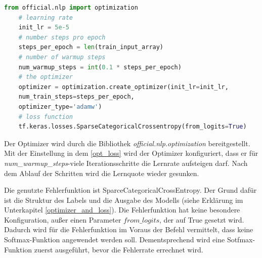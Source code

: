 \begin{lstlisting}[language=Python, caption={BERT Optimizer}, label=opt_loss]
	from official.nlp import optimization
	# learning rate
	init_lr = 5e-5
	# number steps pro epoch
	steps_per_epoch = len(train_input_array)
	# number of warmup steps
	num_warmup_steps = int(0.1 * steps_per_epoch)
	# the optimizer
	optimizer = optimization.create_optimizer(init_lr=init_lr,
	num_train_steps=steps_per_epoch,
	optimizer_type='adamw')
	# loss function
	tf.keras.losses.SparseCategoricalCrossentropy(from_logits=True)
\end{lstlisting}

Der Optimizer wird durch die Bibliothek \textit{official.nlp.optimization} bereitgestellt. Mit der Einstellung in dem \cref{opt_loss} wird der Optimizer konfiguriert, dass er für \textit{num\_warmup\_steps}-viele Iterationsschritte die Lernrate aufsteigen darf. Nach dem Ablauf der Schritten wird die Lernquote wieder gesunken.

Die genutzte Fehlerfunktion ist SparceCategoricalCrossEntropy. Der Grund dafür ist die Struktur des Labels und die Ausgabe des Modells (siehe Erklärung im Unterkapitel \ref{optimizer_and_loss}). Die Fehlerfunktion hat keine besondere Konfiguration, außer einen Parameter $\textit{from\_logits}$, der auf True gesetzt wird. Dadurch wird für die Fehlerfunktion im Voraus der Befehl vermittelt, dass keine Softmax-Funktion angewendet werden soll. Dementsprechend wird eine Sotfmax-Funktion zuerst ausgeführt, bevor die Fehlerrate errechnet wird.
